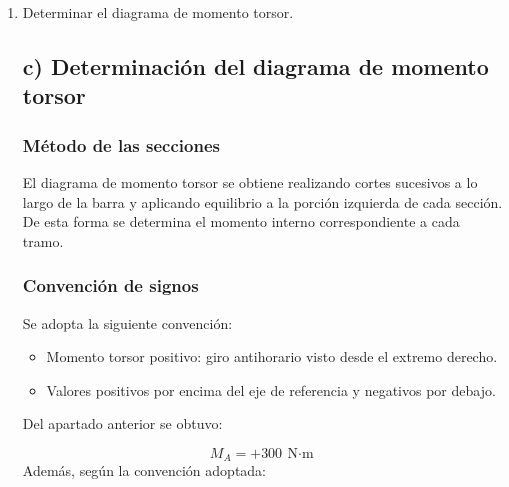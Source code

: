 \documentclass[12pt,a4paper]{article}
\begin{document}
\begin{enumerate}
\subsubsection*{Verificación del equilibrio}

La condición de equilibrio torsional queda verificada mediante:

\begin{equation}
\sum M_x = 300 - 800 + 500 = 0 \quad \checkmark
\end{equation}

El resultado confirma la consistencia de la reacción obtenida. Al tratarse de torsión pura, no intervienen fuerzas axiales ni transversales, por lo que la única reacción relevante es el momento torsor en el empotramiento.

\item[c)] Determinar el diagrama de momento torsor.

\subsection*{c) Determinación del diagrama de momento torsor}

\subsubsection*{Método de las secciones}

El diagrama de momento torsor se obtiene realizando cortes sucesivos a lo largo de la barra y aplicando equilibrio a la porción izquierda de cada sección. De esta forma se determina el momento interno correspondiente a cada tramo.

\subsubsection*{Convención de signos}

Se adopta la siguiente convención:

\begin{itemize}
    \item Momento torsor positivo: giro antihorario visto desde el extremo derecho.
    \item Valores positivos por encima del eje de referencia y negativos por debajo.
\end{itemize}

Del apartado anterior se obtuvo:

\begin{equation}
M_A = +300\ \text{N$\cdot$m}
\end{equation}
Además, según la convención adoptada:


\end{enumerate}
\end{document}
